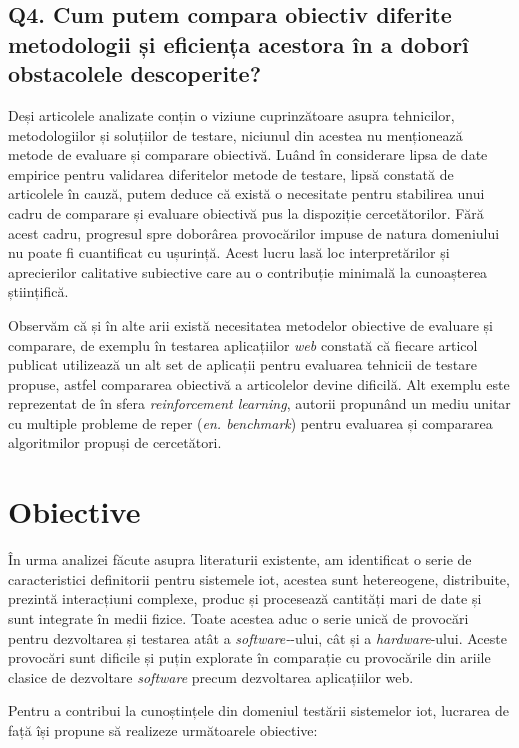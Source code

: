 \subsection*{Q4. Cum putem compara obiectiv diferite metodologii și eficiența acestora în a doborî obstacolele descoperite?}

Deși articolele analizate conțin o viziune cuprinzătoare asupra tehnicilor, metodologiilor și soluțiilor de testare, niciunul din acestea nu menționează metode de evaluare și comparare obiectivă. Luând în considerare lipsa de date empirice pentru validarea diferitelor metode de testare, lipsă constată de articolele în cauză, putem deduce că există o necesitate pentru stabilirea unui cadru de comparare și evaluare obiectivă pus la dispoziție cercetătorilor. Fără acest cadru, progresul spre doborârea provocărilor impuse de natura domeniului nu poate fi cuantificat cu ușurință. Acest lucru lasă loc interpretărilor și aprecierilor calitative subiective care au o contribuție minimală la cunoașterea științifică.

Observăm că și în alte arii există necesitatea metodelor obiective de evaluare și comparare, de exemplu în testarea aplicațiilor \textit{web} \citet{Garousi2013} constată că fiecare articol publicat utilizează un alt set de aplicații pentru evaluarea tehnicii de testare propuse, astfel compararea obiectivă a articolelor devine dificilă. Alt exemplu este reprezentat de \citet{Brockman2016} în sfera \textit{reinforcement learning}, autorii propunând un mediu unitar cu multiple probleme de reper (\textit{en. benchmark}) pentru evaluarea și compararea algoritmilor propuși de cercetători.

\section{Obiective}

În urma analizei făcute asupra literaturii existente, am identificat o serie de caracteristici definitorii pentru sistemele \acrlong{iot}, acestea sunt hetereogene, distribuite, prezintă interacțiuni complexe, produc și procesează cantități mari de date și sunt integrate în medii fizice. Toate acestea aduc o serie unică de provocări pentru dezvoltarea și testarea atât a \textit{software-}-ului, cât și a \textit{hardware}-ului. Aceste provocări sunt dificile și puțin explorate în comparație cu provocările din ariile clasice de dezvoltare \textit{software} precum dezvoltarea aplicațiilor web. 

Pentru a contribui la cunoștințele din domeniul testării sistemelor \acrshort{iot}, lucrarea de față își propune să realizeze următoarele obiective:

